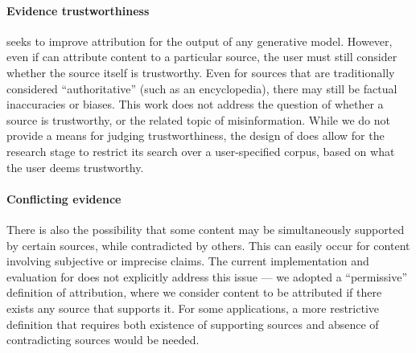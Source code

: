 \paragraph{Evidence trustworthiness}
\approach{} seeks to improve attribution for the output of any generative model. However, even if \approach{} can attribute content to a particular source, the user must still consider whether the source itself is trustworthy. Even for sources that are traditionally considered ``authoritative'' (such as an encyclopedia), there may still be factual inaccuracies or biases. This work does not address the question of whether a source is trustworthy, or the related topic of misinformation.
While we do not provide a means for judging trustworthiness, the design of \approach{} does allow for the research stage to restrict its search over a user-specified corpus, based on what the user deems trustworthy.

\paragraph{Conflicting evidence}
There is also the possibility that some content may be simultaneously supported by certain sources, while contradicted by others. This can easily occur for content involving subjective or imprecise claims. The current implementation and evaluation for \approach{} does not explicitly address this issue --- we adopted a ``permissive'' definition of attribution, where we consider content to be attributed if there exists any source that supports it. For some applications, a more restrictive definition that requires both existence of supporting sources and absence of contradicting sources would be needed.

